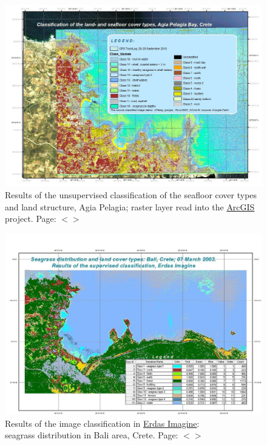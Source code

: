 \documentclass[11pt]{article}
\begin{document}
\begin{appendices}
\begin{figure}[H]
\begin{center}
	\end{center}	
\end{figure}
\begin{figure}[H]
	\begin{center}
		\includegraphics[scale=0.25]{Fig-39.jpg}
		\caption{Results of the unsupervised classification of the seafloor cover types and land structure, Agia Pelagia; raster layer read into the \href{http://www.esri.com/software/arcgis/index.html}{ArcGIS} project. Page: $<$\pageref{page-48}$>$}
		\label{fig:42}
	\end{center}
\end{figure}
\begin{figure}
	\begin{center}
		\includegraphics[scale=0.25]{Fig-36.jpg}
		\caption{Results of the image classification in \href{http://www.erdas.com/products/ERDASIMAGINE/ERDASIMAGINE/Details.aspx}{Erdas Imagine}: \\ seagrass distribution in Bali area, Crete. Page: $<$\pageref{page-48}$>$}
		\label{fig:39}
	\end{center}
\end{figure}
\pagebreak


\end{appendices}
\end{document}
